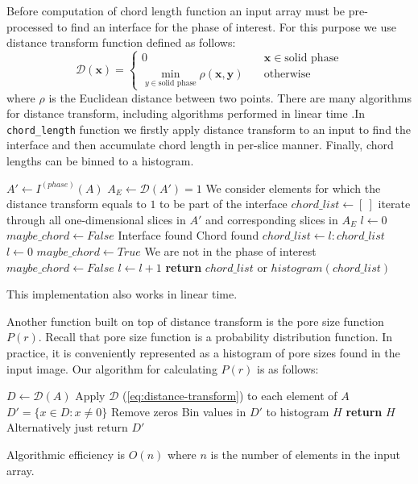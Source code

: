 \documentclass[1p]{elsarticle}
\newcommand{\code}[1]{\colorbox{light-gray}{\texttt{#1}}}
\begin{document}
Before computation of chord length function an input array must be pre-processed
to find an interface for the phase of interest. For this purpose we use
distance transform function defined as follows:
\begin{equation}
  \mathcal{D}(\bm{x})= \left\{
  \begin{array}{ll}
    0 & \quad \bm{x} \in \text{solid phase} \\
    \min\limits_{y \in \text{solid phase}} \rho(\bm{x},\bm{y}) & \quad \text{otherwise}
  \end{array}
\right. \label{eq:distance-transform}
\end{equation}
where $\rho$ is the Euclidean distance between two points. There are many
algorithms for distance transform, including algorithms performed in linear time
\cite{DT}.In \code{chord\_length} function we firstly apply distance transform
to an input to find the interface and then accumulate chord length in per-slice
manner. Finally, chord lengths can be binned to a histogram.
\begin{algorithmic}[1]
    \State $A' \gets I^{(phase)}(A)$
    \State $A_E \gets \mathcal{D}(A') = 1$
    \Comment We consider elements for which the distance transform equals to $1$
    to be part of the interface
    \State $chord\_list \gets [\ ]$
      \Comment iterate through all one-dimensional slices in $A'$ and
      corresponding slices in $A_E$
      \State $l \gets 0$
      \State $maybe\_chord \gets False$
          \Comment Interface found
            \Comment Chord found
            \State $chord\_list \gets l:chord\_list$
          \EndIf
          \State $l \gets 0$
          \State $maybe\_chord \gets True$
          \Comment We are not in the phase of interest
          \State $maybe\_chord \gets False$
        \EndIf
        \State $l \gets l+1$
      \EndFor
    \EndFor
    \State \textbf{return} $chord\_list$ or $histogram(chord\_list)$
  \EndProcedure
\end{algorithmic}
This implementation also works in linear time.

Another function built on top of distance transform is the pore size function
$P(r)$. Recall that pore size function is a probability distribution
function. In practice, it is conveniently represented as a histogram of pore sizes
found in the input image. Our algorithm for calculating $P(r)$ is as follows:
\begin{algorithmic}[1]
    \State $D \gets \mathcal{D}(A)$
    \Comment Apply $\mathcal{D}$ (\cref{eq:distance-transform}) to each element of $A$
    \State $D' = \{ x \in D: x \ne 0\}$
    \Comment Remove zeros
    \State Bin values in $D'$ to histogram $H$
    \State \textbf{return} $H$
    \Comment Alternatively just return $D'$
  \EndProcedure
\end{algorithmic}
Algorithmic efficiency is $O(n)$ where $n$ is the number of elements in the
input array.
\end{document}
